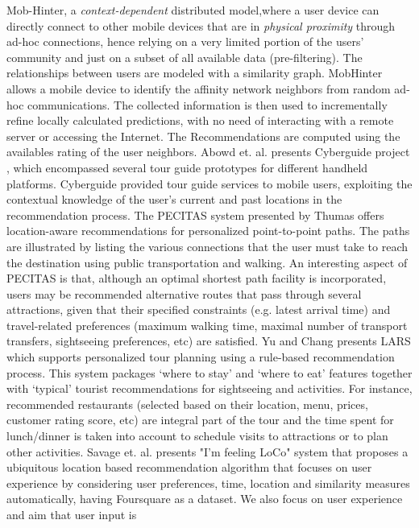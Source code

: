 Mob-Hinter, a \textit{context-dependent} distributed model,where a user device
can directly connect to other mobile devices that are in \textit{physical
proximity} through ad-hoc connections, hence relying on a very limited
portion of the users’ community and just on a subset of all available
data (pre-filtering). The relationships between users are modeled with
a similarity graph. MobHinter allows a mobile device to identify the
affinity network neighbors from random ad-hoc communications. The
collected information is then used to incrementally refine locally
calculated predictions, with no need of interacting with a remote
server or accessing the Internet. The Recommendations are computed
using the availables rating of the user neighbors.
Abowd et. al. presents Cyberguide project \cite{abowd1997cyberguide},
which encompassed several tour guide prototypes for different handheld
platforms. Cyberguide provided tour guide services to mobile users,
exploiting the contextual knowledge of the user’s current and past
locations in the recommendation process. The PECITAS system
\cite{tumas2009personalized} presented by Thumas offers location-aware
recommendations for personalized point-to-point paths. The paths are
illustrated by listing the various connections that the user must take
to reach the destination using public transportation and walking. An
interesting aspect of PECITAS is that, although an optimal shortest 
path facility is incorporated, users may be recommended alternative 
routes that pass through several attractions, given that
their specified constraints (e.g. latest arrival time) and travel-related 
preferences (maximum walking time, maximal number of transport
transfers, sightseeing preferences, etc) are satisfied. Yu and Chang
presents LARS \cite{yu2009personalized} which supports personalized
tour planning using a rule-based recommendation process. This system
packages ‘where to stay’ and ‘where to eat’ features together with
‘typical’ tourist recommendations for sightseeing and activities. For
instance, recommended restaurants (selected based on their location,
menu, prices, customer rating score, etc) are integral part of the
tour and the time spent for lunch/dinner is taken into account to
schedule visits to attractions or to plan other activities.
Savage et. al. presents  "I'm feeling LoCo" system \cite{savage2012m}
that proposes a ubiquitous location­ based recommendation algorithm
that focuses on user experience by considering user preferences, time,
location and similarity measures automatically, having Foursquare as a
dataset. We also focus on user experience and aim that user input is
